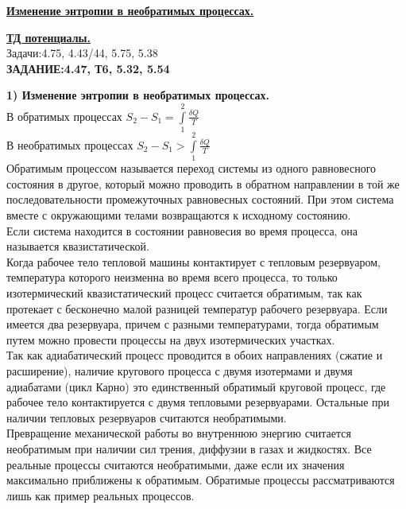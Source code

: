 \documentclass[12pt]{article}
\begin{document}
{\underline{\bf Изменение энтропии в необратимых процессах. }

{\underline{\bf ТД потенциалы.}\\

Задачи:4.75, 4.43/44, 5.75, 5.38  \\

{\bf ЗАДАНИЕ:4.47, Т6, 5.32, 5.54}

\vspace{0.5cm}

{\bf 1) Изменение энтропии в необратимых процессах. }\\

В обратимых процессах $S_2-S_1=\int\limits_1^2\frac{\delta Q}{T}$ \\

В необратимых процессах $S_2-S_1>\int\limits_1^2\frac{\delta Q}{T}$ \\

Обратимым процессом называется переход системы из одного равновесного состояния в другое, который можно проводить в обратном направлении в той же последовательности промежуточных равновесных состояний. При этом система вместе с окружающими телами возвращаются к исходному состоянию.\\

Если система находится в состоянии равновесия во время процесса, она называется квазистатической.\\

Когда рабочее тело тепловой машины контактирует с тепловым резервуаром, температура которого неизменна во время всего процесса, то только изотермический квазистатический процесс считается обратимым, так как протекает с бесконечно малой разницей температур рабочего резервуара. Если имеется два резервуара, причем с разными температурами, тогда обратимым путем можно провести процессы на двух изотермических участках.\\

Так как адиабатический процесс проводится в обоих направлениях (сжатие и расширение), наличие кругового процесса с двумя изотермами и двумя адиабатами (цикл Карно)  это единственный обратимый круговой процесс, где рабочее тело контактируется с двумя тепловыми резервуарами. Остальные при наличии  тепловых резервуаров считаются необратимыми.\\

Превращение механической работы во внутреннюю энергию считается необратимым при наличии сил трения, диффузии  в газах и жидкостях. Все реальные процессы считаются необратимыми, даже если их значения  максимально приближены к обратимым. Обратимые процессы рассматриваются лишь как пример реальных процессов.\\

}}
\end{document}
